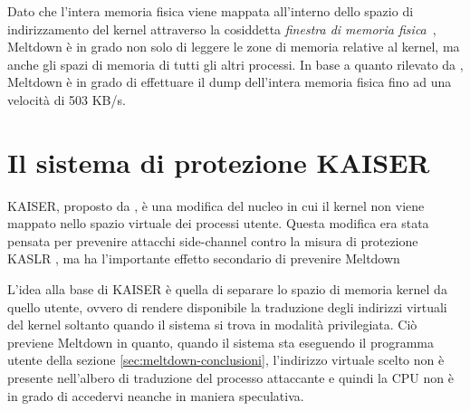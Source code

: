 Dato che l'intera memoria fisica viene mappata all'interno dello spazio di indirizzamento del kernel attraverso la cosiddetta \emph{finestra di memoria fisica}~\cite{lettieri:paginazione-complementi}, Meltdown è in grado non solo di leggere le zone di memoria relative al kernel, ma anche gli spazi di memoria di tutti gli altri processi. In base a quanto rilevato da \textcite{lipp:meltdown}, Meltdown è in grado di effettuare il dump dell'intera memoria fisica fino ad una velocità di 503 KB/s.

\section{Il sistema di protezione KAISER}
KAISER, proposto da \textcite{gruss:kaslr}, è una modifica del nucleo in cui il kernel non viene mappato nello spazio virtuale dei processi utente.
Questa modifica era stata pensata per prevenire attacchi side-channel contro la misura di protezione KASLR \cite{hund:practical-timing-side-channel, gruss:prefetch-side-channel-attacks, jang:breaking-kaslr}, ma ha l'importante effetto secondario di prevenire Meltdown~\cite{lipp:meltdown}

L'idea alla base di KAISER è quella di separare lo spazio di memoria kernel da quello utente, ovvero di rendere disponibile la traduzione degli indirizzi virtuali del kernel soltanto quando il sistema si trova in modalità privilegiata.
Ciò previene Meltdown in quanto, quando il sistema sta eseguendo il programma utente della sezione \vref{sec:meltdown-conclusioni}, l'indirizzo virtuale scelto non è presente nell'albero di traduzione del processo attaccante e quindi la CPU non è in grado di accedervi neanche in maniera speculativa.





